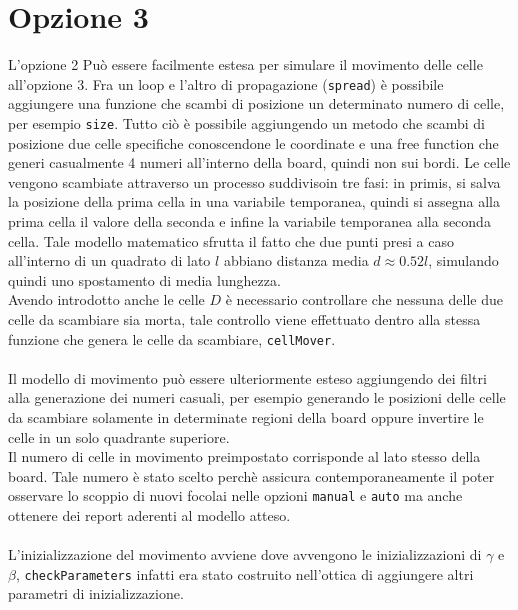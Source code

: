 \documentclass[a4paper]{article}
\begin{document}
\section{Opzione 3}
L'opzione 2 Può essere facilmente estesa per simulare il movimento delle celle all'opzione 3. Fra un loop e l'altro di propagazione (\texttt{spread}) è possibile aggiungere una funzione che scambi di posizione un determinato numero di celle, per esempio \texttt{size}. Tutto ciò è possibile aggiungendo un metodo che scambi di posizione due celle specifiche conoscendone le coordinate e una free function che generi casualmente 4 numeri all'interno della board, quindi non sui bordi. Le celle vengono scambiate attraverso un processo suddivisoin tre fasi: in primis, si salva la posizione della prima cella in una variabile temporanea, quindi si assegna alla prima cella il valore della seconda e infine la variabile temporanea alla seconda cella. Tale modello matematico sfrutta il fatto che due punti presi a caso all'interno di un quadrato di lato $l$ abbiano distanza media $d \approx 0.52l$, simulando quindi uno spostamento di media lunghezza.\\
Avendo introdotto anche le celle $D$ è necessario controllare che nessuna delle due celle da scambiare sia morta, tale controllo viene effettuato dentro alla stessa funzione che genera le celle da scambiare, \texttt{cellMover}.\\ \\
Il modello di movimento può essere ulteriormente esteso aggiungendo dei filtri alla generazione dei numeri casuali, per esempio generando le posizioni delle celle da scambiare solamente in determinate regioni della board oppure invertire le celle in un solo quadrante superiore.\\
Il numero di celle in movimento preimpostato corrisponde al lato stesso della board. Tale numero è stato scelto perchè assicura contemporaneamente il poter osservare lo scoppio di nuovi focolai nelle opzioni \texttt{manual} e \texttt{auto} ma anche ottenere dei report aderenti al modello atteso. \\ \\
L'inizializzazione del movimento avviene dove avvengono le inizializzazioni di $\gamma$ e $\beta$, \texttt{checkParameters} infatti era stato costruito nell'ottica di aggiungere altri parametri di inizializzazione.
\end{document}
